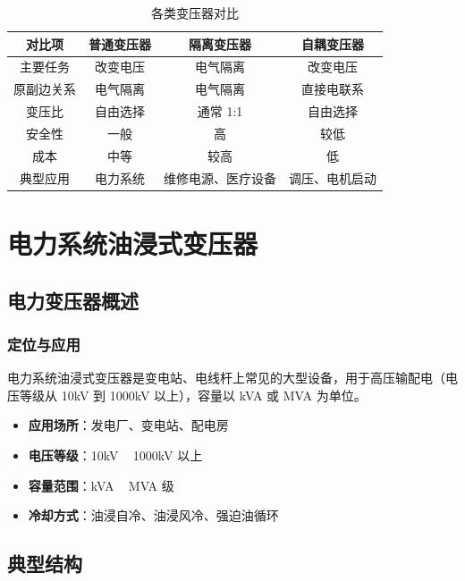 \documentclass[12pt,UTF8]{ctexbook}
\begin{document}
\begin{table}[htbp]
\centering
\caption{各类变压器对比}
\small
\begin{tabular}{|c|c|c|c|}
\hline
\textbf{对比项} & \textbf{普通变压器} & \textbf{隔离变压器} & \textbf{自耦变压器} \\
\hline
主要任务 & 改变电压 & 电气隔离 & 改变电压 \\
\hline
原副边关系 & 电气隔离 & 电气隔离 & 直接电联系 \\
\hline
变压比 & 自由选择 & 通常 1:1 & 自由选择 \\
\hline
安全性 & 一般 & 高 & 较低 \\
\hline
成本 & 中等 & 较高 & 低 \\
\hline
典型应用 & 电力系统 & 维修电源、医疗设备 & 调压、电机启动 \\
\hline
\end{tabular}
\end{table}

\part{电力系统油浸式变压器}

\chapter{电力变压器概述}
\label{chap:power_overview}

\section{定位与应用}

电力系统油浸式变压器是变电站、电线杆上常见的大型设备，用于高压输配电（电压等级从 10kV 到 1000kV 以上），容量以 kVA 或 MVA 为单位。

\begin{itemize}[leftmargin=2cm]
    \item \textbf{应用场所}：发电厂、变电站、配电房
    \item \textbf{电压等级}：10kV ~ 1000kV 以上
    \item \textbf{容量范围}：kVA ~ MVA 级
    \item \textbf{冷却方式}：油浸自冷、油浸风冷、强迫油循环
\end{itemize}

\chapter{典型结构}
\label{chap:power_structure}
\end{document}
